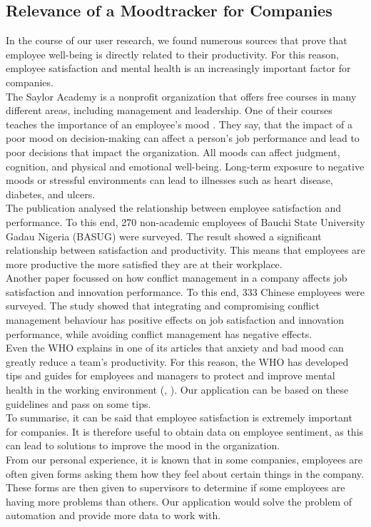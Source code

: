 \documentclass[11pt]{article}
\begin{document}
\subsection{Relevance of a Moodtracker for Companies}
In the course of our user research, we found numerous sources that prove that employee well-being is directly related to their productivity. For this reason, employee satisfaction and mental health is an increasingly important factor for companies.\\
The Saylor Academy is a nonprofit organization that offers free courses in many different areas, including management and leadership. One of their courses teaches the importance of an employee's mood \cite{noauthor_bus401_nodate}. They say, that the impact of a poor mood on decision-making can affect a person's job performance and lead to poor decisions that impact the organization. All moods can affect judgment, cognition, and physical and emotional well-being. Long-term exposure to negative moods or stressful environments can lead to illnesses such as heart disease, diabetes, and ulcers.\\
The publication \cite{inuwa_job_2016} analysed the relationship between employee satisfaction and performance. To this end, 270 non-academic employees of Bauchi State University Gadau Nigeria (BASUG) were surveyed. The result showed a significant relationship between satisfaction and productivity. This means that employees are more productive the more satisfied they are at their workplace.\\
Another paper \cite{chen_improving_2012} focussed on how conflict management in a company affects job satisfaction and innovation performance. To this end, 333 Chinese employees were surveyed. The study showed that integrating and compromising conflict management behaviour has positive effects on job satisfaction and innovation performance, while avoiding conflict management has negative effects.\\
Even the WHO explains in one of its articles that anxiety and bad mood can greatly reduce a team's productivity.\cite{noauthor_mental_nodate} For this reason, the WHO has developed tips and guides for employees and managers to protect and improve mental health in the working environment (\cite{WHO_guide_employee}, \cite{WHO_guide_policymakers}). Our application can be based on these guidelines and pass on some tips.\vspace{5mm} \\ 
To summarise, it can be said that employee satisfaction is extremely important for companies. It is therefore useful to obtain data on employee sentiment, as this can lead to solutions to improve the mood in the organization.\\
From our personal experience, it is known that in some companies, employees are often given forms asking them how they feel about certain things in the company. These forms are then given to supervisors to determine if some employees are having more problems than others.
Our application would solve the problem of automation and provide more data to work with.
\end{document}
